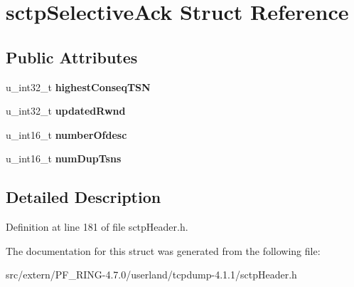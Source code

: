 \hypertarget{structsctp_selective_ack}{
\section{sctpSelectiveAck Struct Reference}
\label{structsctp_selective_ack}
}
\subsection*{Public Attributes}
\begin{DoxyCompactItemize}
\item 
\hypertarget{structsctp_selective_ack_a0717840aaa932bbcfe9c9474e57871bc}{
u\_\-int32\_\-t {\bfseries highestConseqTSN}}
\label{structsctp_selective_ack_a0717840aaa932bbcfe9c9474e57871bc}

\item 
\hypertarget{structsctp_selective_ack_a99a44a5c612190cebce202b727ab7ef0}{
u\_\-int32\_\-t {\bfseries updatedRwnd}}
\label{structsctp_selective_ack_a99a44a5c612190cebce202b727ab7ef0}

\item 
\hypertarget{structsctp_selective_ack_ac05387040957713b9acaab186f17c10b}{
u\_\-int16\_\-t {\bfseries numberOfdesc}}
\label{structsctp_selective_ack_ac05387040957713b9acaab186f17c10b}

\item 
\hypertarget{structsctp_selective_ack_a2ba6712142032c1a80993b6b58280a23}{
u\_\-int16\_\-t {\bfseries numDupTsns}}
\label{structsctp_selective_ack_a2ba6712142032c1a80993b6b58280a23}

\end{DoxyCompactItemize}


\subsection{Detailed Description}


Definition at line 181 of file sctpHeader.h.



The documentation for this struct was generated from the following file:\begin{DoxyCompactItemize}
\item 
src/extern/PF\_\-RING-\/4.7.0/userland/tcpdump-\/4.1.1/sctpHeader.h\end{DoxyCompactItemize}
